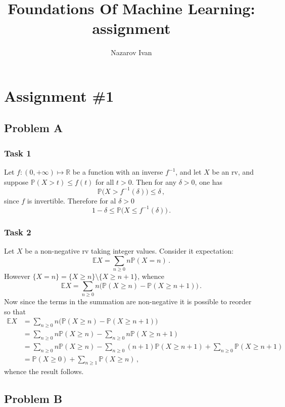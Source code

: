 \documentclass[a4paper]{article}
\title{Foundations Of Machine Learning: assignment}
\author{Nazarov Ivan}
\newcommand{\Real}{\mathbb{R}}
\newcommand{\ex}{\mathbb{E}}
\newcommand{\pr}{\mathbb{P}}
\begin{document}
\section{Assignment \#1} %
\label{sec:assignment_1}

\subsection{Problem A} %
\label{sub:problem_a}

\subsubsection{Task 1} %
\label{ssub:task_1}

Let $f:(0, +\infty)\mapsto\Real$ be a function with an inverse $f^{-1}$, and let
$X$ be an rv, and suppose $\pr(X > t)\leq f(t)$ for all $t>0$. Then for any $\delta>0$,
one has
\[ \pr\bigl(X>f^{-1}(\delta)\bigr) \leq \delta \,, \]
since $f$ is invertible. Therefore for al $\delta>0$
\[ 1-\delta \leq \pr\bigl(X \leq f^{-1}(\delta)\bigr) \,. \]


\subsubsection{Task 2} %
\label{ssub:task_2}

Let $X$ be a non-negative rv taking integer values. Consider it expectation:
\[ \ex X = \sum_{n\geq 0} n \pr(X=n) \,. \]
However $\{X=n\} = \{X\geq n\}\setminus \{X\geq n+1\}$, whence
\[ \ex X = \sum_{n\geq 0} n \bigl(\pr(X\geq n) - \pr(X\geq n+1)\bigr) \,. \]
Now since the terms in the summation are non-negative it is possible to reorder
so that
\begin{align*}
	\ex X
    &= \sum_{n\geq 0} n \bigl(\pr(X\geq n) - \pr(X\geq n+1)\bigr) \\
    &= \sum_{n\geq 0} n \pr(X\geq n)
      - \sum_{n\geq 0} n \pr(X\geq n+1) \\
    &= \sum_{n\geq 0} n \pr(X\geq n)
      - \sum_{n\geq 0} (n+1) \pr(X\geq n+1)
      + \sum_{n\geq 0} \pr(X\geq n+1) \\
    &= \pr(X\geq 0) + \sum_{n\geq 1} \pr(X\geq n) \,,
\end{align*}
whence the result follows.



\subsection{Problem B} %
\label{sub:problem_b}
\end{document}
